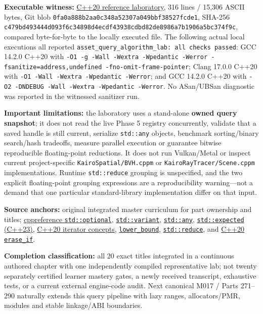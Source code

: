 \textbf{Executable witness:} \hyperref[source-file-c479bd493444d093f6c34898]{C++20 reference laboratory}, 316 lines / 15,306 ASCII bytes, Git blob \texttt{0fa0a888b2aa0c348a52307a049bbf38527fcde1}, SHA-256 \texttt{c479bd493444d093f6c34898d4ecdf43938cdbd82de8986a7b1906a5bc374f9c}, compared byte-for-byte to the locally executed file. The following actual local executions all reported \texttt{asset\_query\_algorithm\_lab:\ all\ checks\ passed}: GCC 14.2.0 C++20 with \texttt{-O1\ -g\ -Wall\ -Wextra\ -Wpedantic\ -Werror\ -fsanitize=address,undefined\ -fno-omit-frame-pointer}; Clang 17.0.0 C++20 with \texttt{-O1\ -Wall\ -Wextra\ -Wpedantic\ -Werror}; and GCC 14.2.0 C++20 with \texttt{-O2\ -DNDEBUG\ -Wall\ -Wextra\ -Wpedantic\ -Werror}. No ASan/UBSan diagnostic was reported in the witnessed sanitizer run.

\textbf{Important limitations:} the laboratory uses a stand-alone \textbf{owned query snapshot}; it does not read the live Phase 5 registry concurrently, validate that a saved handle is still current, serialize \texttt{std::any} objects, benchmark sorting/binary search/hash tradeoffs, measure parallel execution or guarantee bitwise reproducible floating-point reductions. It does not run Vulkan/Metal or inspect current project-specific \texttt{KairoSpatial/BVH.cppm} or \texttt{KairoRayTracer/Scene.cppm} implementations. Runtime \texttt{std::reduce} grouping is unspecified, and the two explicit floating-point grouping expressions are a reproducibility warning---not a demand that one particular standard-library implementation differ on that input.

\textbf{Source anchors:} original integrated master curriculum for part ownership and titles; \href{https://en.cppreference.com/w/cpp/utility/optional}{cppreference \texttt{std::optional}}, \href{https://en.cppreference.com/w/cpp/utility/variant}{\texttt{std::variant}}, \href{https://en.cppreference.com/w/cpp/utility/any}{\texttt{std::any}}, \href{https://en.cppreference.com/w/cpp/utility/expected}{\texttt{std::expected} (C++23)}, \href{https://en.cppreference.com/w/cpp/iterator}{C++20 iterator concepts}, \href{https://en.cppreference.com/w/cpp/algorithm/lower_bound}{\texttt{lower\_bound}}, \href{https://en.cppreference.com/cpp/algorithm/reduce}{\texttt{std::reduce}}, and \href{https://en.cppreference.com/cpp/container/unordered_map/erase_if}{C++20 \texttt{erase\_if}}.

\textbf{Completion classification:} all 20 exact titles integrated in a continuous authored chapter with one independently compiled representative lab; not twenty separately certified learner mastery gates, a newly received transcript, exhaustive tests, or a current external engine-code audit. Next canonical M017 / Parts 271--290 naturally extends this query pipeline with lazy ranges, allocators/PMR, modules and stable linkage/ABI boundaries.

